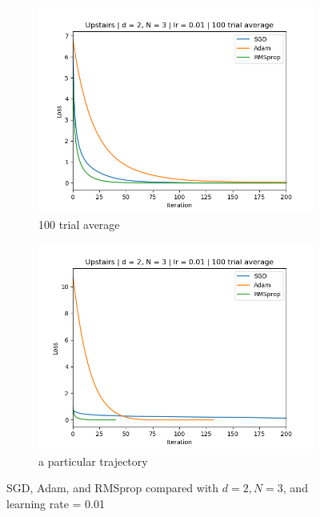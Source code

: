 \documentclass[11pt]{article}
\begin{document}
\begin{figure}[h!]
    \begin{subfigure}{0.5\textwidth}
        \centering
        \includegraphics[width=\textwidth]{images/upstairs_avg_optimizers.png}
        \caption{100 trial average}
        \label{fig:upstairs_avg_optimizers}
    \end{subfigure}
    \begin{subfigure}{0.5\textwidth}
        \centering
        \includegraphics[width=\textwidth]{images/upstairs_1_optimizers.png}
        \caption{a particular trajectory}
        \label{fig:upstairs_1_optimizers}
    \end{subfigure}
    \caption{SGD, Adam, and RMSprop compared with $d = 2, N = 3$, and learning rate = 0.01}
    \label{fig:results:optimizers}
\end{figure}
\end{document}
